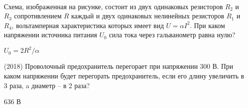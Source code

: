 \begin{ex}
\hspace{0pt} \\
\begin{minipage}{.65\textwidth}
Схема, изображенная на рисунке, состоит из двух одинаковых резисторов $R_2$ и $R_3$ сопротивлением $R$ каждый и двух одинаковых нелинейных резисторов $R_1$ и $R_4$, вольтамперная характеристика которых имеет вид $U = \alpha I^2$. При каком напряжении источника питания $U_0$ сила тока через гальванометр равна нулю?
\end{minipage}
\begin{minipage}{.35\textwidth}
\centering
{}
\end{minipage}
\begin{ans}
$U_0 = 2R^2/\alpha$
\end{ans}
\end{ex}

\begin{ex}
(2018) Проволочный предохранитель перегорает при напряжении 300 В. При каком напряжении будет перегорать предохранитель, если его длину увеличить в 3 раза, a диаметр -- в 2 раза?
\begin{ans}
636 В
\end{ans}
\end{ex}